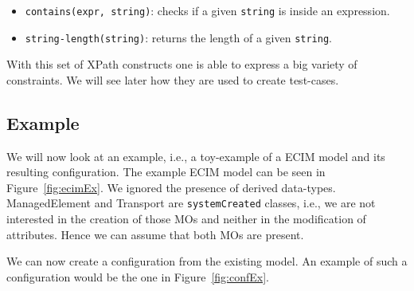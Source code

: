 \begin{itemize}
\begin{itemize}
  \item \verb|contains(expr, string)|: checks if a given \verb|string| is inside an expression.
  
  \item \verb|string-length(string)|: returns the length of a given \verb|string|. 
 \end{itemize}
 

\end{itemize}

With this set of XPath constructs one is able to express a big variety of constraints. We will see later how they are used to create test-cases.

\subsection{Example}

We will now look at an example, i.e., a toy-example of a ECIM model and its resulting configuration. The example ECIM model can be seen in Figure~\ref{fig:ecimEx}. We ignored the presence of derived data-types. \textsf{ManagedElement} and \textsf{Transport} are \verb|systemCreated| classes, i.e., we are not interested in the creation of those MOs and neither in the modification of attributes. Hence we can assume that both MOs are present. 



We can now create a configuration from the existing model. An example of such a configuration would be the one in Figure~\ref{fig:confEx}.

